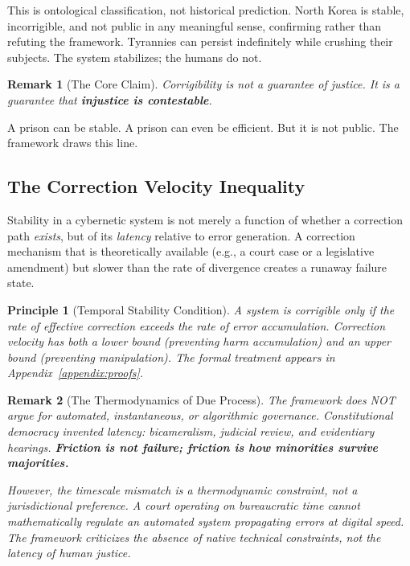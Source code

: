 \documentclass{article}
\newtheorem{remark}{Remark}[section]
\newtheorem{principle}{Principle}[section]
\begin{document}
This is ontological classification, not historical prediction. North Korea is stable, incorrigible, and not public in any meaningful sense, confirming rather than refuting the framework. Tyrannies can persist indefinitely while crushing their subjects. The system stabilizes; the humans do not.

\begin{remark}[The Core Claim]
Corrigibility is not a guarantee of justice. It is a guarantee that \textbf{injustice is contestable}.
\end{remark}

A prison can be stable. A prison can even be efficient. But it is not public. The framework draws this line.

\subsection{The Correction Velocity Inequality}
\label{subsec:velocity}

Stability in a cybernetic system is not merely a function of whether a correction path \textit{exists}, but of its \textit{latency} relative to error generation. A correction mechanism that is theoretically available (e.g., a court case or a legislative amendment) but slower than the rate of divergence creates a runaway failure state.

\begin{principle}[Temporal Stability Condition]
A system is corrigible only if the rate of effective correction exceeds the rate of error accumulation. Correction velocity has both a lower bound (preventing harm accumulation) and an upper bound (preventing manipulation). The formal treatment appears in Appendix~\ref{appendix:proofs}.
\end{principle}

\begin{remark}[The Thermodynamics of Due Process]
The framework does NOT argue for automated, instantaneous, or algorithmic governance. Constitutional democracy invented latency: bicameralism, judicial review, and evidentiary hearings. \textbf{Friction is not failure; friction is how minorities survive majorities.}

However, the timescale mismatch is a thermodynamic constraint, not a jurisdictional preference. A court operating on bureaucratic time cannot mathematically regulate an automated system propagating errors at digital speed. The framework criticizes the \textit{absence} of native technical constraints, not the \textit{latency} of human justice.
\end{remark}
\end{document}
